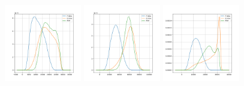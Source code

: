 \begin{figure}[!ht]
    \centering
    \includegraphics[width=0.3\textwidth]{../images/realworldexperiments/butterflies/kde/kde_grayscale_histogram.png}
    \includegraphics[width=0.3\textwidth]{../images/realworldexperiments/butterflies/kde/kde_hsv_histogram.png}
    \includegraphics[width=0.3\textwidth]{../images/realworldexperiments/butterflies/kde/kde_hue_histogram.png}
\end{figure}
